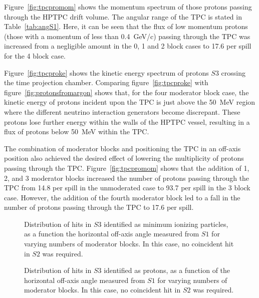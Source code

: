 Figure~\ref{fig:tpcpromom} shows the momentum spectrum of those protons passing through the HPTPC drift volume.
The angular range of the TPC is stated in Table~\ref{tab:angS1}.
Here, it can be seen that the flux of low momentum protons (those with a momentum of less than 0.4~GeV/c) passing through the TPC was increased from a negligible amount in the 0, 1 and 2 block cases to 17.6 per spill for the 4 block case.

Figure~\ref{fig:tpcproke} shows the kinetic energy spectrum of protons $\mathit{S3}$ crossing the time projection chamber.
Comparing figure~\ref{fig:tpcproke} with figure~\ref{fig:protonsfromargon} shows that, for the four moderator block case, the kinetic energy of protons incident upon the TPC is just above the 50~MeV region where the different neutrino interaction generators become discrepant.
These protons lose further energy within the walls of the HPTPC vessel, resulting in a flux of protons below 50~MeV within the TPC.

The combination of moderator blocks and positioning the TPC in an off-axis position also achieved the desired effect of lowering the multiplicity of protons passing through the TPC.
Figure~\ref{fig:tpcpromom} shows that the addition of 1, 2, and 3 moderator blocks increased the number of protons passing through the TPC from 14.8 per spill in the unmoderated case to 93.7 per spill in the 3 block case.
However, the addition of the fourth moderator block led to a fall in the number of protons passing through the TPC to 17.6 per spill.
  
\begin{figure}[h]
  \begin{minipage}{0.48\textwidth}
    \begin{adjustbox}{max totalsize={\textwidth}{.35\textheight},center}
      
    \end{adjustbox}
    \caption{Distribution of hits in $\mathit{S3}$ identified as minimum ionizing particles, as a function the horizontal off-axis angle measured from $\mathit{S1}$ for varying numbers of moderator blocks. In this case, no coincident hit in $\mathit{S2}$ was required.}
    \label{fig:s1s3mips}
  \end{minipage}
  \hspace{0.3cm}
  \begin{minipage}{0.48\textwidth}
    \begin{adjustbox}{max totalsize={\textwidth}{.35\textheight},center}
      
    \end{adjustbox}
    \caption{Distribution of hits in $\mathit{S3}$ identified as protons, as a function of the horizontal off-axis angle measured from $\mathit{S1}$ for varying numbers of moderator blocks. In this case, no coincident hit in $\mathit{S2}$ was required.}
    \label{fig:s1s3protons}
  \end{minipage}
\end{figure}

